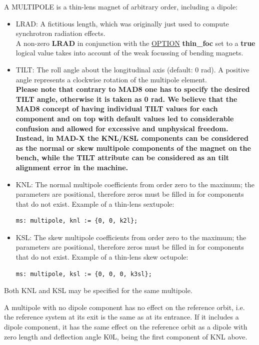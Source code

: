 A MULTIPOLE is a thin-lens magnet of arbitrary order, including a dipole: 
\begin{itemize}
    \item LRAD: A fictitious length, which was originally just used to
      compute synchrotron radiation effects. \\
      A non-zero \textbf{ LRAD } in conjunction  with the
      \href{../control/general.html#option}{OPTION}\textbf{ thin\_foc }
      set to a \textbf{ true } logical value takes into account of the
      weak focussing of bending magnets.  
    \item TILT: The roll angle about the longitudinal axis (default: 0
      rad). A positive angle represents a clockwise rotation of the
      multipole element. \\
      \textbf{  Please note that contrary to MAD8 one has to specify the
        desired TILT angle, otherwise it is taken as 0 rad. We believe
        that the MAD8 concept of having individual TILT values for each
        component and on top with default values led to considerable
        confusion and allowed for excessive and unphysical
        freedom. Instead, in MAD-X the KNL/KSL components can be
        considered as the normal or skew multipole components of the
        magnet on the bench, while the TILT attribute can be considered
        as an tilt alignment error in the machine. } 
    \item KNL: The normal multipole coefficients from order zero to the
      maximum; the parameters are positional, therefore zeros must be
      filled in for components that do not exist. Example of a thin-lens
      sextupole:  
\begin{verbatim}
ms: multipole, knl := {0, 0, k2l};
\end{verbatim}

   \item KSL: The skew multipole coefficients from order zero to the
     maximum; the parameters are positional, therefore zeros must be
     filled in for components that do not exist. Example of a thin-lens
     skew octupole:  
\begin{verbatim}
ms: multipole, ksl := {0, 0, 0, k3sl};
\end{verbatim}

\end{itemize} 

Both KNL and KSL may be specified for the same multipole. 

A multipole with no dipole component has no effect on the reference
orbit, i.e. the reference system at its exit is the same as at its
entrance. If it includes a dipole component, it has the same effect on
the reference orbit as a dipole with zero length and deflection angle
K0L, being the first component of KNL above.  


